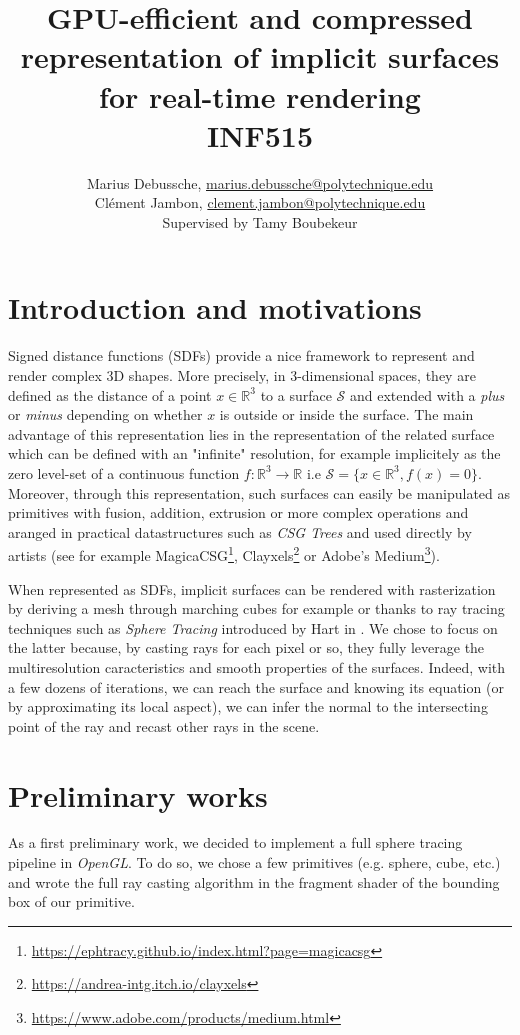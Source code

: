\documentclass[10pt,a4paper,english, twocolumn]{article}
\title{\textbf{GPU-efficient and compressed representation of
implicit surfaces for real-time rendering} \\ INF515}
\author{Marius Debussche, \href{mailto:marius.debussche@polytechnique.edu}{marius.debussche@polytechnique.edu} \\ Clément Jambon, \href{mailto:clement.jambon@polytechnique.edu}{clement.jambon@polytechnique.edu} \\ Supervised by Tamy Boubekeur}
\begin{document}
\maketitle

\section{Introduction and motivations}
Signed distance functions (SDFs) provide a nice framework to represent and render complex 3D shapes. More precisely, in 3-dimensional spaces, they are defined as the distance of a point $x\in\mathbb{R}^3$ to a surface $\mathcal{S}$ and extended with a \textit{plus} or \textit{minus} depending on whether $x$ is outside or inside the surface. The main advantage of this representation lies in the representation of the related surface which can be defined with an "infinite" resolution, for example implicitely as the zero level-set of a continuous function $f:\mathbb{R}^3\to\mathbb{R}$ i.e $\mathcal{S}=\{x\in\mathbb{R}^3, f(x)=0\}$. Moreover, through this representation, such surfaces can easily be manipulated as primitives with fusion, addition, extrusion or more complex operations and aranged in practical datastructures such as \textit{CSG Trees} and used directly by artists (see for example MagicaCSG\footnote{\url{https://ephtracy.github.io/index.html?page=magicacsg}}, Clayxels\footnote{\url{https://andrea-intg.itch.io/clayxels}} or Adobe's Medium\footnote{\url{https://www.adobe.com/products/medium.html}}).

When represented as SDFs, implicit surfaces can be rendered with rasterization by deriving a mesh through marching cubes for example or thanks to ray tracing techniques such as \textit{Sphere Tracing} introduced by Hart in \cite{Hart1996SphereTA}. We chose to focus on the latter because, by casting rays for each pixel or so, they fully leverage the multiresolution caracteristics and smooth properties of the surfaces. Indeed, with a few dozens of iterations, we can reach the surface and knowing its equation (or by approximating its local aspect), we can infer the normal to the intersecting point of the ray and recast other rays in the scene.

\section{Preliminary works}
As a first preliminary work, we decided to implement a full sphere tracing pipeline in \textit{OpenGL}. To do so, we chose a few primitives (e.g. sphere, cube, etc.) and wrote the full ray casting algorithm in the fragment shader of the bounding box of our primitive.
\end{document}
